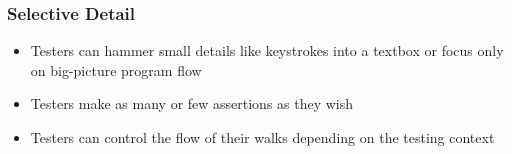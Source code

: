 \begin{frame}
  \frametitle{Selective Detail}
  \begin{itemize}
    \item Testers can hammer small details like keystrokes into a textbox or focus only on big-picture program flow
    \item Testers make as many or few assertions as they wish
    \item Testers can control the flow of their walks depending on the testing context
  \end{itemize}
\end{frame}
